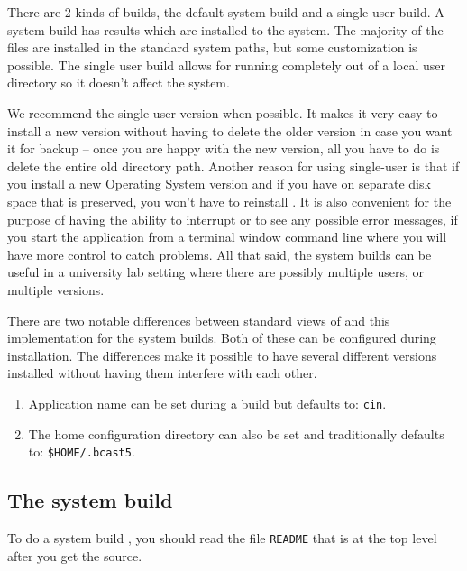 There are 2 kinds of builds, the default system-build and a
single-user build.  A system build has results which are installed
to the system.  The majority of the files are installed in the
standard system paths, but some customization is possible.  The
single user build allows for running completely out of a local
user directory so it doesn't affect the system.

We recommend the single-user version when possible.  It makes it
very easy to install a new version without having to delete the
older version in case you want it for backup -- once you are happy
with the new version, all you have to do is delete the entire old
directory path.  Another reason for using single-user is that if
you install a new Operating System version and if you have \CGG{}
on separate disk space that is preserved, you won't have to
reinstall \CGG{}.  It is also convenient for the purpose of having
the ability to interrupt or to see any possible error messages, if
you start the application from a terminal window command line
where you will have more control to catch problems.  All that
said, the system builds can be useful in a university lab setting
where there are possibly multiple users, or multiple versions.

There are two notable differences between standard views
of \CGG{} and this implementation for the system builds.  Both of
these can be configured during installation.  The differences make
it possible to have several different versions installed without
having them interfere with each other.

\begin{enumerate}
\item Application name can be set during a build but defaults
  to: \texttt{cin}.
\item The home configuration directory can also be set and
  traditionally defaults to: \texttt{\$HOME/.bcast5}.
\end{enumerate}


\subsection{The system build}
\label{sec:system-build}

To do a system build  , you should read the file
\texttt{README} that is at the top level after you get the source.

